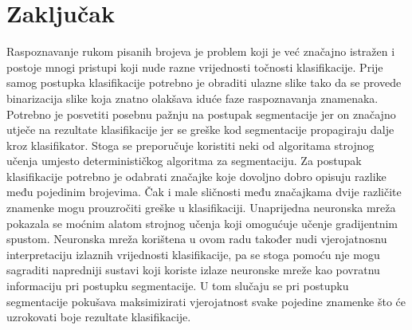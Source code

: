 \chapter{Zaključak}
\label{ch:zakljucak}
Raspoznavanje rukom pisanih brojeva je problem koji je već značajno istražen i postoje mnogi pristupi koji nude razne
vrijednosti točnosti klasifikacije. Prije samog postupka klasifikacije potrebno je obraditi ulazne slike tako da se
provede binarizacija slike koja znatno olakšava iduće faze raspoznavanja znamenaka. Potrebno je posvetiti posebnu
pažnju na postupak segmentacije jer on značajno utječe na rezultate klasifikacije jer se greške kod segmentacije
propagiraju dalje kroz klasifikator. Stoga se preporučuje koristiti neki od algoritama strojnog učenja umjesto
determinističkog algoritma za segmentaciju. Za postupak klasifikacije potrebno je odabrati značajke koje dovoljno dobro
opisuju razlike među pojedinim brojevima. Čak i male sličnosti među značajkama dvije različite znamenke mogu prouzročiti
greške u klasifikaciji. Unaprijedna neuronska mreža pokazala se moćnim alatom strojnog učenja koji omogućuje učenje
gradijentnim spustom. Neuronska mreža korištena u ovom radu također nudi vjerojatnosnu interpretaciju izlaznih
vrijednosti klasifikacije, pa se stoga pomoću nje mogu sagraditi napredniji sustavi koji koriste izlaze neuronske mreže
kao povratnu informaciju pri postupku segmentacije. U tom slučaju se pri postupku segmentacije pokušava maksimizirati
vjerojatnost svake pojedine znamenke što će uzrokovati boje rezultate klasifikacije.

